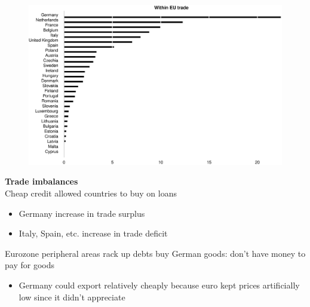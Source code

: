 \documentclass{beamer}
\begin{document}
\begin{frame}
  \begin{figure}
    \includegraphics[scale=.3]{within_trade.eps}
  \end{figure}
\end{frame}

\begin{frame}
  \textbf{Trade imbalances}\\
  Cheap credit allowed countries to buy on loans
  \begin{itemize}
    \item Germany increase in trade surplus
    \item Italy, Spain, etc. increase in trade deficit
  \end{itemize}
  \medskip
  Eurozone peripheral areas rack up debts buy German goods: don't have money to pay for goods  
  \begin{itemize}
    \item Germany could export relatively cheaply because euro kept prices artificially low since it didn't appreciate
  \end{itemize}
\end{frame}
\end{document}
